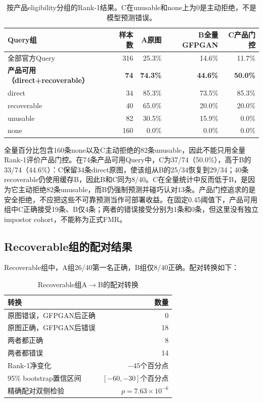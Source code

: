 \documentclass[UTF8,a4paper,11pt]{ctexart}
\begin{document}
\begin{table}[H]
\centering
\caption{按产品eligibility分组的Rank-1结果。C在unusable和none上为0是主动拒绝，不是模型预测错误。}
\label{tab:formal-rank1}
\renewcommand{\arraystretch}{1.15}
\begin{tabular}{lrrrr}
\toprule
Query组 & 样本数 & A原图 & B全量GFPGAN & C产品门控\\
\midrule
全部官方Query & 316 & 25.3\% & 14.6\% & 11.7\%\\
\textbf{产品可用（direct+recoverable）} & \textbf{74} & \textbf{74.3\%} & \textbf{44.6\%} & \textbf{50.0\%}\\
direct & 34 & 85.3\% & 73.5\% & 85.3\%\\
recoverable & 40 & 65.0\% & 20.0\% & 20.0\%\\
unusable & 82 & 30.5\% & 15.9\% & 0.0\%\\
none & 160 & 0.0\% & 0.0\% & 0.0\%\\
\bottomrule
\end{tabular}
\end{table}

全量百分比包含160条none以及C主动拒绝的82条unusable，因此不能只用全量Rank-1评价产品门控。在74条产品可用Query中，C为37/74（50.0\%），高于B的33/74（44.6\%）：C保留34条direct原图，使该组从B的25/34恢复到29/34；40条recoverable仍使用缓存B，因此B和C同为8/40。C在全量统计中反而低于B，是因为它主动拒绝82条unusable，而B仍强制预测并碰巧认对13条。产品门控追求的是安全拒绝，不应把这些不可靠预测当作可部署收益。在固定0.45阈值下，产品可用组中C正确接受19条、B仅4条；两者的错误接受分别为1条和0条，但这里没有独立impostor cohort，不能称为正式FMR。

\subsection{Recoverable组的配对结果}

Recoverable组中，A组26/40第一名正确，B组仅8/40正确。配对转换如下：

\begin{table}[H]
\centering
\caption{Recoverable组A$\rightarrow$B的配对转换}
\label{tab:paired}
\begin{tabular}{lr}
\toprule
转换 & 数量\\
\midrule
原图错误，GFPGAN后正确 & 0\\
原图正确，GFPGAN后错误 & 18\\
两者都正确 & 8\\
两者都错误 & 14\\
\midrule
Rank-1净变化 & $-45$个百分点\\
95\% bootstrap置信区间 & $[-60,-30]$个百分点\\
精确配对双侧检验 & $p=7.63\times10^{-6}$\\
\bottomrule
\end{tabular}
\end{table}
\end{document}
